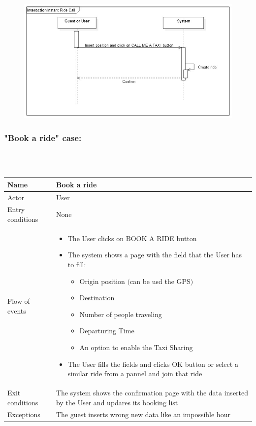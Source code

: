 \begin{figure}[h!]
	\centering
	\includegraphics[height=0.4\textheight]{"myTaxiServiceImg/SequenceDiagram/Instant Ride Call"}
\end{figure}


\newpage
\subsubsection{"Book a ride" case:}
\hfill \\
\\
\begin{tabular}{|p{3cm}|p{10cm}|}
\hline
Name & Book a ride\\
\hline
Actor & User\\
\hline
Entry conditions & None\\
\hline
Flow of events &
	\begin{itemize}
		\item The User clicks on BOOK A RIDE button
		\item The system shows a page with the field that the User has to fill:
		\begin{itemize}
			\item Origin position $($can be usd the GPS$)$
			\item Destination
			\item Number of people traveling
			\item Departuring Time
			\item An option to enable the Taxi Sharing
		\end{itemize}
		\item The User fills the fields and clicks OK button or select a similar ride from a pannel and join that ride
	\end{itemize}\\
\hline
Exit conditions & The system shows the confirmation page with the data inserted by the User and updares its booking list\\
\hline
Exceptions & The guest inserts wrong new data like an impossible hour\\
\hline
\end {tabular}

